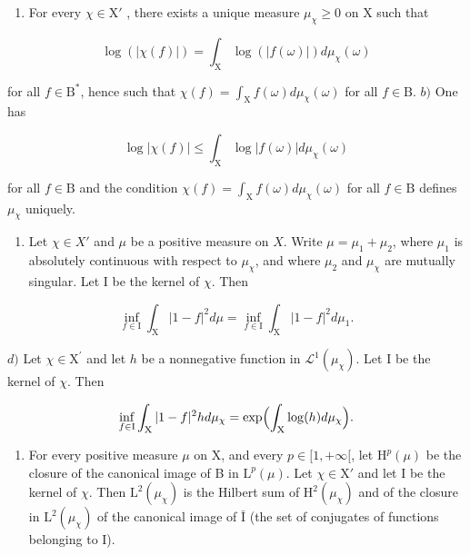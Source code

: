 \begin{enumerate}
\def\labelenumi{\alph{enumi})}
\tightlist
\item
  For every \(\chi \in \mathrm{X}'\) , there exists a unique measure \(\mu_{\chi} \geqslant 0\) on X such that
\end{enumerate}

\[
\log (| \chi (f) |) = \int_ {\mathrm{X}} \log (| f (\omega) |) d \mu_ {\chi} (\omega)
\]

for all \(f \in \mathrm{B}^*\), hence such that \(\chi(f) = \int_{\mathrm{X}} f(\omega) d\mu_{\chi}(\omega)\) for all \(f \in \mathrm{B}\). \(b)\) One has

\[
\log | \chi (f) | \leqslant \int_ {\mathrm{X}} \log | f (\omega) | d \mu_ {\chi} (\omega)
\]

for all \(f \in \mathrm{B}\) and the condition \(\chi(f) = \int_{\mathrm{X}} f(\omega) d\mu_{\chi}(\omega)\) for all \(f \in \mathrm{B}\) defines \(\mu_{\chi}\) uniquely.

\begin{enumerate}
\def\labelenumi{\alph{enumi})}
\setcounter{enumi}{2}
\tightlist
\item
  Let \(\chi \in X'\) and \(\mu\) be a positive measure on \(X\). Write \(\mu = \mu_1 + \mu_2\), where \(\mu_1\) is absolutely continuous with respect to \(\mu_{\chi}\), and where \(\mu_2\) and \(\mu_{\chi}\) are mutually singular. Let I be the kernel of \(\chi\). Then
\end{enumerate}

\[
\inf _ {f \in \mathrm{I}} \int_ {\mathrm{X}} | 1 - f | ^ {2} d \mu = \inf _ {f \in \mathrm{I}} \int_ {\mathrm{X}} | 1 - f | ^ {2} d \mu_ {1}.
\]

\(d)\) Let \(\chi\in\mathrm{X}^{\prime}\) and let \(h\) be a nonnegative function in \(\mathcal{L}^{1}(\mu_{\chi})\). Let I be the kernel of \(\chi\). Then

\[
\inf _ {f \in \mathrm{I}} \int_ {\mathrm{X}} | 1 - f | ^ {2} h d \mu_ {\chi} = \exp \Bigl (\int_ {\mathrm{X}} \log (h) d \mu_ {\chi} \Bigr).
\]

\begin{enumerate}
\def\labelenumi{\alph{enumi})}
\setcounter{enumi}{4}
\tightlist
\item
  For every positive measure \(\mu\) on X, and every \(p \in [1, +\infty[\), let \(\mathrm{H}^p(\mu)\) be the closure of the canonical image of B in \(\mathrm{L}^p(\mu)\). Let \(\chi \in \mathrm{X}'\) and let I be the kernel of \(\chi\). Then \(\mathrm{L}^2(\mu_\chi)\) is the Hilbert sum of \(\mathrm{H}^2(\mu_\chi)\) and of the closure in \(\mathrm{L}^2(\mu_\chi)\) of the canonical image of \(\bar{\mathrm{I}}\) (the set of conjugates of functions belonging to I).
\end{enumerate}

